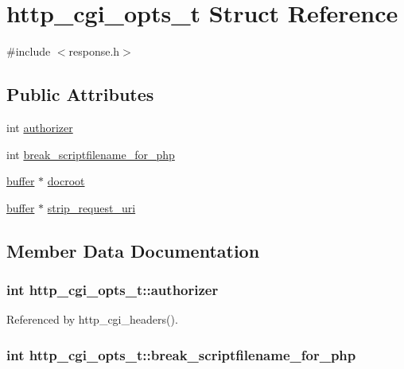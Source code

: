 \hypertarget{structhttp__cgi__opts__t}{\section{http\-\_\-cgi\-\_\-opts\-\_\-t Struct Reference}
\label{structhttp__cgi__opts__t}
}


{\ttfamily \#include $<$response.\-h$>$}

\subsection*{Public Attributes}
\begin{DoxyCompactItemize}
\item 
int \hyperlink{structhttp__cgi__opts__t_ab4c410f4c401e50d0cf14cd77756d772}{authorizer}
\item 
int \hyperlink{structhttp__cgi__opts__t_af5900ac9824be8a7ea2eca4a3bef8bb3}{break\-\_\-scriptfilename\-\_\-for\-\_\-php}
\item 
\hyperlink{structbuffer}{buffer} $\ast$ \hyperlink{structhttp__cgi__opts__t_a2dac1f6b409deaa93b8f8a8221fddb26}{docroot}
\item 
\hyperlink{structbuffer}{buffer} $\ast$ \hyperlink{structhttp__cgi__opts__t_a52d465ab78e6b8d0c00651cbcc9c9640}{strip\-\_\-request\-\_\-uri}
\end{DoxyCompactItemize}


\subsection{Member Data Documentation}
\hypertarget{structhttp__cgi__opts__t_ab4c410f4c401e50d0cf14cd77756d772}{
\subsubsection[{authorizer}]{\setlength{\rightskip}{0pt plus 5cm}int http\-\_\-cgi\-\_\-opts\-\_\-t\-::authorizer}}\label{structhttp__cgi__opts__t_ab4c410f4c401e50d0cf14cd77756d772}


Referenced by http\-\_\-cgi\-\_\-headers().

\hypertarget{structhttp__cgi__opts__t_af5900ac9824be8a7ea2eca4a3bef8bb3}{
\subsubsection[{break\-\_\-scriptfilename\-\_\-for\-\_\-php}]{\setlength{\rightskip}{0pt plus 5cm}int http\-\_\-cgi\-\_\-opts\-\_\-t\-::break\-\_\-scriptfilename\-\_\-for\-\_\-php}}\label{structhttp__cgi__opts__t_af5900ac9824be8a7ea2eca4a3bef8bb3}


